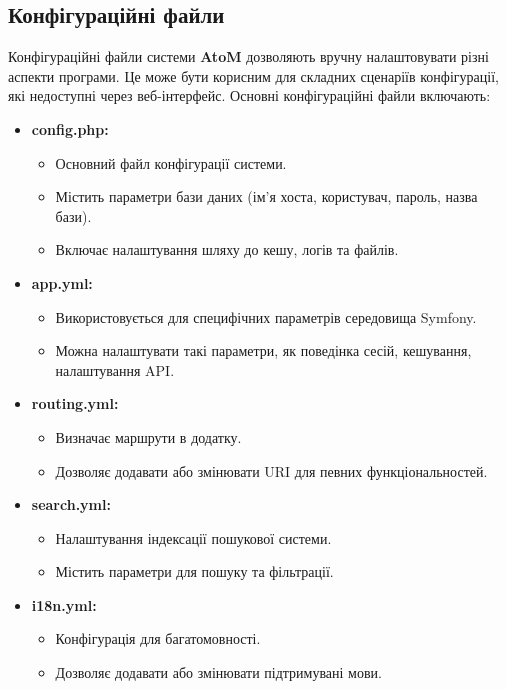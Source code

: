 \documentclass[14pt,a4paper]{article}
\begin{document}
\begin{large}
\subsection{Конфігураційні файли}

Конфігураційні файли системи \textbf{AtoM} дозволяють вручну налаштовувати різні аспекти програми. Це може бути корисним для складних сценаріїв конфігурації, які недоступні через веб-інтерфейс. Основні конфігураційні файли включають:

\begin{itemize}
    \item \textbf{config.php:}
        \begin{itemize}
            \item Основний файл конфігурації системи.
            \item Містить параметри бази даних (ім'я хоста, користувач, пароль, назва бази).
            \item Включає налаштування шляху до кешу, логів та файлів.
        \end{itemize}
    \item \textbf{app.yml:}
        \begin{itemize}
            \item Використовується для специфічних параметрів середовища Symfony.
            \item Можна налаштувати такі параметри, як поведінка сесій, кешування, налаштування API.
        \end{itemize}
    \item \textbf{routing.yml:}
        \begin{itemize}
            \item Визначає маршрути в додатку.
            \item Дозволяє додавати або змінювати URI для певних функціональностей.
        \end{itemize}
    \item \textbf{search.yml:}
        \begin{itemize}
            \item Налаштування індексації пошукової системи.
            \item Містить параметри для пошуку та фільтрації.
        \end{itemize}
    \item \textbf{i18n.yml:}
        \begin{itemize}
            \item Конфігурація для багатомовності.
            \item Дозволяє додавати або змінювати підтримувані мови.
        \end{itemize}
\end{itemize}


\end{large}
\end{document}
